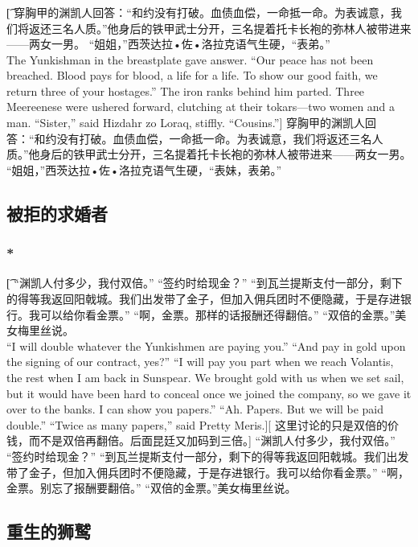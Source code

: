 \documentclass[12pt,a4paper]{article}
\begin{document}
\subsubsection{}\t[	
	穿胸甲的渊凯人回答：“和约没有打破。血债血偿，一命抵一命。为表诚意，我们将返还三名人质。”他身后的铁甲武士分开，三名提着托卡长袍的弥林人被带进来——两女一男。
	“姐姐，”西茨达拉•佐•洛拉克语气生硬，“表弟。”\\
	The Yunkishman in the breastplate gave answer. “Our peace has not been breached. Blood pays for blood, a life for a life. To show our good faith, we return three of your hostages.” The iron ranks behind him parted. Three Meereenese were ushered forward, clutching at their tokars—two women and a man.
	“Sister,” said Hizdahr zo Loraq, stiffly. “Cousins.”]
	穿胸甲的渊凯人回答：“和约没有打破。血债血偿，一命抵一命。为表诚意，我们将返还三名人质。”他身后的铁甲武士分开，三名提着托卡长袍的弥林人被带进来——两女一男。
	“姐姐，”西茨达拉•佐•洛拉克语气生硬，“表妹，表弟。”
\subsection{被拒的求婚者}
\subsubsection{\color{red}*}\t[
	“渊凯人付多少，我付双倍。”
	“签约时给现金？”
	“到瓦兰提斯支付一部分，剩下的得等我返回阳戟城。我们出发带了金子，但加入佣兵团时不便隐藏，于是存进银行。我可以给你看金票。”
	“啊，金票。那样的话报酬还得翻倍。”
	“双倍的金票。”美女梅里丝说。\\
	“I will double whatever the Yunkishmen are paying you.”
	“And pay in gold upon the signing of our contract, yes?”
	“I will pay you part when we reach Volantis, the rest when I am back in Sunspear. We brought gold with us when we set sail, but it would have been hard to conceal once we joined the company, so we gave it over to the banks. I can show you papers.”
	“Ah. Papers. But we will be paid double.”
	“Twice as many papers,” said Pretty Meris.][
	这里讨论的只是双倍的价钱，而不是双倍再翻倍。后面昆廷又加码到三倍。]
	“渊凯人付多少，我付双倍。”
	“签约时给现金？”
	“到瓦兰提斯支付一部分，剩下的得等我返回阳戟城。我们出发带了金子，但加入佣兵团时不便隐藏，于是存进银行。我可以给你看金票。”
	“啊，金票。别忘了报酬要翻倍。”
	“双倍的金票。”美女梅里丝说。
	
\subsection{重生的狮鹫}
\end{document}
